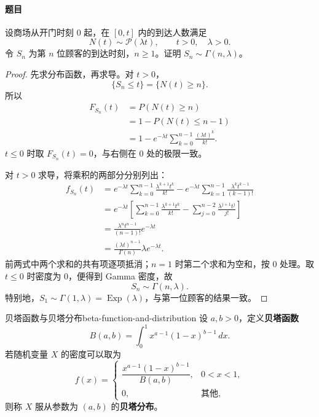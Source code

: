 \paragraph{题目}
设商场从开门时刻 $0$ 起，在 $[0,t]$ 内的到达人数满足
\[
N(t)\sim\mathcal P(\lambda t),\qquad t>0,\quad\lambda>0.
\]
令 $S_n$ 为第 $n$ 位顾客的到达时刻，$n\geq1$。证明 $S_n\sim\Gamma(n,\lambda)$。

\begin{proof}
先求分布函数，再求导。对 $t>0$，
\[
\{S_n\leq t\}=\{N(t)\geq n\}.
\]
所以
\[
\begin{aligned}
F_{S_n}(t)
&=P(N(t)\geq n)\\
&=1-P(N(t)\leq n-1)\\
&=1-e^{-\lambda t}\sum_{k=0}^{n-1}\frac{(\lambda t)^k}{k!}.
\end{aligned}
\]
$t\leq0$ 时取 $F_{S_n}(t)=0$，与右侧在 $0$ 处的极限一致。

对 $t>0$ 求导，将乘积的两部分分别列出：
\[
\begin{aligned}
f_{S_n}(t)
&=e^{-\lambda t}\sum_{k=0}^{n-1}
\frac{\lambda^{k+1}t^k}{k!}
-e^{-\lambda t}\sum_{k=1}^{n-1}
\frac{\lambda^kt^{k-1}}{(k-1)!}\\
&=e^{-\lambda t}\left[
\sum_{k=0}^{n-1}\frac{\lambda^{k+1}t^k}{k!}
-\sum_{j=0}^{n-2}\frac{\lambda^{j+1}t^j}{j!}
\right]\\
&=\frac{\lambda^nt^{n-1}}{(n-1)!}e^{-\lambda t}\\
&=\frac{(\lambda t)^{n-1}}{\Gamma(n)}
\lambda e^{-\lambda t}.
\end{aligned}
\]
前两式中两个求和的共有项逐项抵消；$n=1$ 时第二个求和为空和，按 $0$ 处理。取 $t\leq0$ 时密度为 $0$，便得到 Gamma 密度，故
\[
S_n\sim\Gamma(n,\lambda).
\]
特别地，$S_1\sim\Gamma(1,\lambda)=\operatorname{Exp}(\lambda)$，与第一位顾客的结果一致。
\end{proof}

\begin{mydefinition}{贝塔函数与贝塔分布}{beta-function-and-distribution}
设 $a,b>0$，定义\textbf{贝塔函数}
\[
B(a,b)=\int_0^1x^{a-1}(1-x)^{b-1}\,dx.
\]
若随机变量 $X$ 的密度可以取为
\[
f(x)=
\begin{cases}
\dfrac{x^{a-1}(1-x)^{b-1}}{B(a,b)},&0<x<1,\\[0.5em]
0,&\text{其他},
\end{cases}
\]
则称 $X$ 服从参数为 $(a,b)$ 的\textbf{贝塔分布}。
\end{mydefinition}

